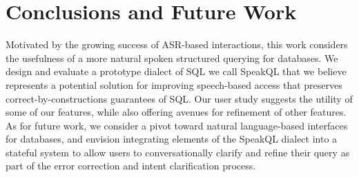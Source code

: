 \section{Conclusions and Future Work}


Motivated by the growing success of ASR-based interactions, this work considers the usefulness of a more natural spoken structured querying for databases. 
We design and evaluate a prototype dialect of SQL we call SpeakQL that we believe represents a potential solution for improving speech-based access that preserves correct-by-constructions guarantees of SQL. 
Our user study suggests the utility of some of our features, while also offering avenues for refinement of other features.
As for future work, we consider a pivot toward natural language-based interfaces for databases, and envision integrating elements of the SpeakQL dialect into a stateful system to allow users to conversationally clarify and refine their query as part of the error correction and intent clarification process.








\clearpage


